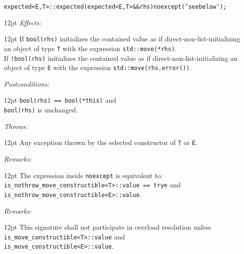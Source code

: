 \documentclass[a4paper,10pt]{article}
\newcommand{\cpp}[1]{\lstinline{#1}}
\newcommand{\wordingItem}[1]{\noindent\textit{#1:}}
\newenvironment{wordingTextItem}[1]{\wordingItem{#1}\vspace{2pt}\noindent\begin{adjustwidth}{12pt}{}}{\vspace{2pt}\end{adjustwidth}}
\newenvironment{wordingPara}{\begin{adjustwidth}{12pt}{}}{\end{adjustwidth}}
\newcommand{\suppress}[1]{\colorbox{suppress_color}{#1}}
\begin{document}
\begin{alltt}
\suppress{expected<E,T>::}expected(expected\suppress{<E,T>} && rhs) noexcept('see below');
\end{alltt}
\begin{wordingPara}
\begin{wordingTextItem}{Effects}
If \cpp{bool(rhs)} initializes the contained value as if direct-non-list-initializing an object of type \cpp{T} with the expression \cpp{std::move(*rhs)}. \\

\noindent
If \cpp{!bool(rhs)} initializes the contained value as if direct-non-list-initializing an object of type \cpp{E} with the expression \cpp{std::move(rhs.error())}.
\end{wordingTextItem}
\begin{wordingTextItem}{Postconditions}
\cpp{bool(rhs) == bool(*this)} and \\
\cpp{bool(rhs)} is unchanged.
\end{wordingTextItem}
\begin{wordingTextItem}{Throws}
Any exception thrown by the selected constructor of \cpp{T} or \cpp{E}.
\end{wordingTextItem}
\begin{wordingTextItem}{Remarks}
The expression inside \cpp{noexcept} is equivalent to:\\
\cpp{is_nothrow_move_constructible<T>::value == trye} and   \\
\cpp{is_nothrow_move_constructible<E>::value}.
\end{wordingTextItem}
\begin{wordingTextItem}{Remarks}
This signature shall not participate in overload resolution unless\\
\cpp{is_move_constructible<T>::value} and \\
\cpp{is_move_constructible<E>::value}.
\end{wordingTextItem}
\end{wordingPara}
\end{document}
